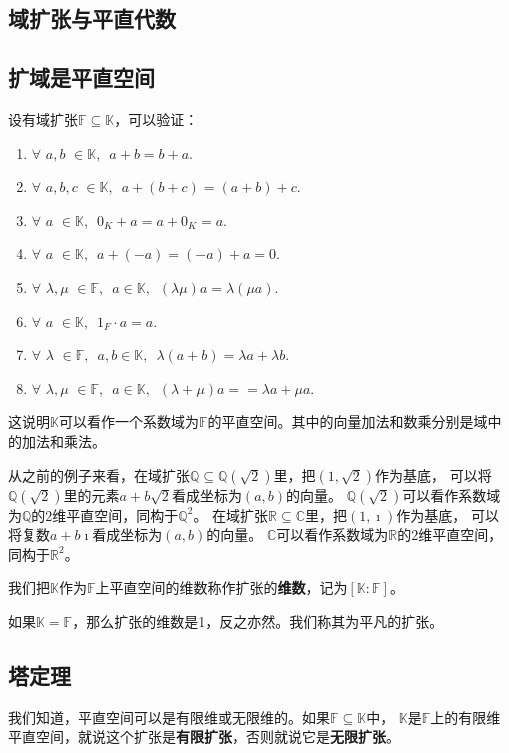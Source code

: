 \documentclass[12pt,UTF8]{ctexbook}
\begin{document}
\begin{appendix}
\section{域扩张与平直代数}
\subsection{扩域是平直空间}
设有域扩张$\mathbb{F} \subseteq \mathbb{K}$，可以验证：
\begin{enumerate}
    \item $\forall \,\, a, b \,\, \in \mathbb{K}, \,\,\, a + b = b + a.$
    \item $\forall \,\, a, b, c \,\, \in \mathbb{K}, \,\,\, a + (b + c) = (a + b) + c.$
    \item $\forall \,\, a \,\, \in \mathbb{K}, \,\,\, 0_K + a = a + 0_K = a.$
    \item $\forall \,\, a \,\, \in \mathbb{K}, \,\,\, a + (-a) = (-a) + a = 0.$
    \item $\forall \,\, \lambda, \mu \,\, \in \mathbb{F}, \,\,\, a \in \mathbb{K}, \,\,\, (\lambda \mu) a = \lambda(\mu a). $
    \item $\forall \,\, a \,\, \in \mathbb{K}, \,\,\, 1_F \cdot a = a.$
    \item $\forall \,\, \lambda \,\, \in \mathbb{F}, \,\,\, a, b \in \mathbb{K}, \,\,\, \lambda(a + b) = \lambda a + \lambda b.$
    \item $\forall \,\, \lambda, \mu \,\, \in \mathbb{F}, \,\,\, a \in \mathbb{K}, \,\,\, (\lambda + \mu) a =  = \lambda a + \mu a.$
\end{enumerate}
这说明$\mathbb{K}$可以看作一个系数域为$\mathbb{F}$的平直空间。其中的向量加法和数乘分别是域中的加法和乘法。

从之前的例子来看，在域扩张$\mathbb{Q} \subseteq \mathbb{Q}(\sqrt{2})$里，把$(1, \sqrt{2})$作为基底，
可以将$\mathbb{Q}(\sqrt{2})$里的元素$a + b\sqrt{2}$看成坐标为$(a, b)$的向量。
$\mathbb{Q}(\sqrt{2})$可以看作系数域为$\mathbb{Q}$的$2$维平直空间，同构于$\mathbb{Q}^2$。
在域扩张$\mathbb{R} \subseteq \mathbb{C}$里，把$(1, \imath )$作为基底，
可以将复数$a + b\imath $看成坐标为$(a, b)$的向量。
$\mathbb{C}$可以看作系数域为$\mathbb{R}$的$2$维平直空间，同构于$\mathbb{R}^2$。

我们把$\mathbb{K}$作为$\mathbb{F}$上平直空间的维数称作扩张的\textbf{维数}，记为$[\mathbb{K} : \mathbb{F}]$。

如果$\mathbb{K} = \mathbb{F}$，那么扩张的维数是1，反之亦然。我们称其为平凡的扩张。

\subsection{塔定理}
我们知道，平直空间可以是有限维或无限维的。如果$\mathbb{F} \subseteq \mathbb{K}$中，
$\mathbb{K}$是$\mathbb{F}$上的有限维平直空间，就说这个扩张是\textbf{有限扩张}，否则就说它是\textbf{无限扩张}。


\end{appendix}
\end{document}
